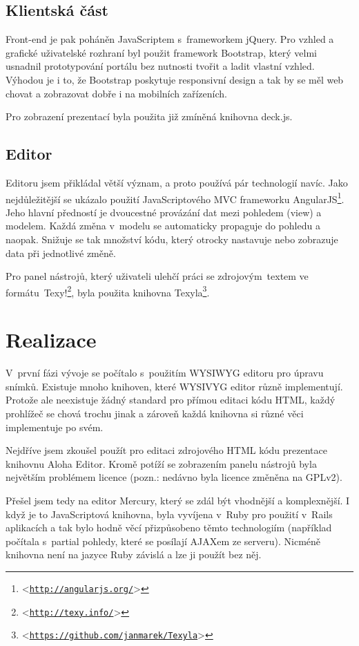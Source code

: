 \documentclass[11pt,twoside,a4paper]{book}
\let\oldUrl\url									%
\renewcommand\url[1]{<\texttt{\oldUrl{#1}}>}
\begin{document}
\section{Klientská část}
Front-end je pak poháněn JavaScriptem s~frameworkem jQuery. Pro vzhled a grafické uživatelské rozhraní byl použit framework Bootstrap, který velmi usnadnil prototypování portálu bez nutnosti tvořit a ladit vlastní vzhled. Výhodou je i to, že Bootstrap poskytuje responsivní design a tak by se měl web chovat a zobrazovat dobře i na mobilních zařízeních.

Pro zobrazení prezentací byla použita již zmíněná knihovna deck.js.


\section{Editor}
Editoru jsem přikládal větší význam, a proto používá pár technologií navíc. Jako nejdůležitější se ukázalo použití JavaScriptového MVC frameworku AngularJS\footnote{\url{http://angularjs.org/}}. Jeho hlavní předností je dvoucestné provázání dat mezi pohledem (view) a modelem. Každá změna v~modelu se automaticky propaguje do pohledu a naopak. Snižuje se tak množství kódu, který otrocky nastavuje nebo zobrazuje data při jednotlivé změně.

Pro panel nástrojů, který uživateli ulehčí práci se zdrojovým~textem ve formátu~Texy!\footnote{\url{http://texy.info/}}, byla použita knihovna Texyla\footnote{\url{https://github.com/janmarek/Texyla}}.



\chapter{Realizace} \label{chap:realizace}
V~první fázi vývoje se počítalo s~použitím WYSIWYG editoru pro úpravu snímků. Existuje mnoho knihoven, které WYSIVYG
editor různě implementují. Protože ale neexistuje žádný standard pro přímou editaci kódu HTML, každý prohlížeč se chová
trochu jinak a zároveň každá knihovna si různé věci implementuje po svém.

Nejdříve jsem zkoušel použít pro editaci zdrojového HTML kódu prezentace knihovnu Aloha Editor. Kromě potíží se
zobrazením panelu nástrojů byla největším problémem licence (pozn.: nedávno byla licence změněna na GPLv2).

Přešel jsem tedy na editor Mercury, který se zdál být vhodnější a komplexnější. I když je to JavaScriptová knihovna,
byla vyvíjena v~Ruby pro použití v~Rails aplikacích a tak bylo hodně věcí přizpůsobeno těmto technologiím (například
počítala s~partial pohledy, které se posílají AJAXem ze serveru). Nicméně knihovna není na jazyce Ruby závislá a lze ji
použít bez něj.
\end{document}
